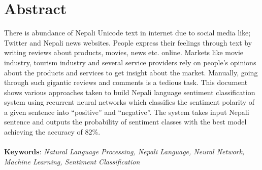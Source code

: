 		\large
			\chapter*{Abstract}
		\normalsize
		\justify
		There is abundance of Nepali Unicode text in internet due to social media like; Twitter
and Nepali news websites. People express their feelings through text by writing reviews
about products, movies, news etc. online. Markets like movie industry, tourism industry
and several service providers rely on people’s opinions about the products and services
to get insight about the market. Manually, going through such gigantic reviews and
comments is a tedious task. This document shows various approaches taken to build
Nepali language sentiment classification system using recurrent neural networks which
classifies the sentiment polarity of a given sentence into “positive” and “negative”. The
system takes input Nepali sentence and outputs the probability of sentiment classes with
the best model achieving the accuracy of 82\%.\\
        \vspace{0.1in}\\
		\textbf{Keywords}: 
		\textit{Natural Language Processing, Nepali Language, Neural Network, Machine Learning, Sentiment Classification}\\

		\break

	    \tableofcontents

		\listoftables
		\break
		\pagebreak

		\listoffigures
		     
		\break
	
	
	
		\Large
			\begingroup
				\let\clearpage\relax
